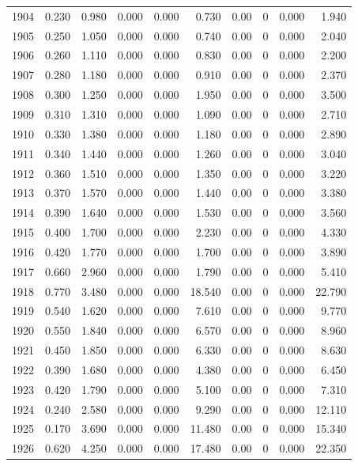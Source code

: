 \documentclass[
]{scrartcl}
\begin{document}
\begin{landscape}
\begin{longtable}{rrrrrrrrrr}
1904 & 0.230 & 0.980 & 0.000 & 0.000 & 0.730 & 0.00 & 0 & 0.000 & 1.940 \\ 
1905 & 0.250 & 1.050 & 0.000 & 0.000 & 0.740 & 0.00 & 0 & 0.000 & 2.040 \\ 
1906 & 0.260 & 1.110 & 0.000 & 0.000 & 0.830 & 0.00 & 0 & 0.000 & 2.200 \\ 
1907 & 0.280 & 1.180 & 0.000 & 0.000 & 0.910 & 0.00 & 0 & 0.000 & 2.370 \\ 
1908 & 0.300 & 1.250 & 0.000 & 0.000 & 1.950 & 0.00 & 0 & 0.000 & 3.500 \\ 
1909 & 0.310 & 1.310 & 0.000 & 0.000 & 1.090 & 0.00 & 0 & 0.000 & 2.710 \\ 
1910 & 0.330 & 1.380 & 0.000 & 0.000 & 1.180 & 0.00 & 0 & 0.000 & 2.890 \\ 
1911 & 0.340 & 1.440 & 0.000 & 0.000 & 1.260 & 0.00 & 0 & 0.000 & 3.040 \\ 
1912 & 0.360 & 1.510 & 0.000 & 0.000 & 1.350 & 0.00 & 0 & 0.000 & 3.220 \\ 
1913 & 0.370 & 1.570 & 0.000 & 0.000 & 1.440 & 0.00 & 0 & 0.000 & 3.380 \\ 
1914 & 0.390 & 1.640 & 0.000 & 0.000 & 1.530 & 0.00 & 0 & 0.000 & 3.560 \\ 
1915 & 0.400 & 1.700 & 0.000 & 0.000 & 2.230 & 0.00 & 0 & 0.000 & 4.330 \\ 
1916 & 0.420 & 1.770 & 0.000 & 0.000 & 1.700 & 0.00 & 0 & 0.000 & 3.890 \\ 
1917 & 0.660 & 2.960 & 0.000 & 0.000 & 1.790 & 0.00 & 0 & 0.000 & 5.410 \\ 
1918 & 0.770 & 3.480 & 0.000 & 0.000 & 18.540 & 0.00 & 0 & 0.000 & 22.790 \\ 
1919 & 0.540 & 1.620 & 0.000 & 0.000 & 7.610 & 0.00 & 0 & 0.000 & 9.770 \\ 
1920 & 0.550 & 1.840 & 0.000 & 0.000 & 6.570 & 0.00 & 0 & 0.000 & 8.960 \\ 
1921 & 0.450 & 1.850 & 0.000 & 0.000 & 6.330 & 0.00 & 0 & 0.000 & 8.630 \\ 
1922 & 0.390 & 1.680 & 0.000 & 0.000 & 4.380 & 0.00 & 0 & 0.000 & 6.450 \\ 
1923 & 0.420 & 1.790 & 0.000 & 0.000 & 5.100 & 0.00 & 0 & 0.000 & 7.310 \\ 
1924 & 0.240 & 2.580 & 0.000 & 0.000 & 9.290 & 0.00 & 0 & 0.000 & 12.110 \\ 
1925 & 0.170 & 3.690 & 0.000 & 0.000 & 11.480 & 0.00 & 0 & 0.000 & 15.340 \\ 
1926 & 0.620 & 4.250 & 0.000 & 0.000 & 17.480 & 0.00 & 0 & 0.000 & 22.350 \\ 

\end{longtable}
\end{landscape}
\end{document}
